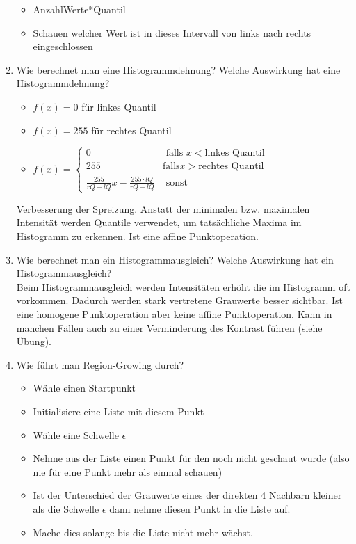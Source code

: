 \begin{enumerate}
	\begin{itemize}
		\item AnzahlWerte*Quantil
		\item Schauen welcher Wert ist in dieses Intervall von links nach rechts eingeschlossen
	\end{itemize}
	
	\item Wie berechnet man eine Histogrammdehnung? Welche Auswirkung hat eine Histogrammdehnung?
	
	\begin{itemize}
		\item $f(x)=0$ für linkes Quantil
		\item $f(x)=255$ für rechtes Quantil
		\item $f(x) = \left\{ \begin{array}{cl} 0 & \textrm{ falls } x < \textrm{linkes Quantil} \\ 255 & \textrm{falls} x>\textrm{rechtes Quantil} \\ \frac{255}{rQ-lQ}x-\frac{255 \cdot lQ}{rQ-lQ} & \textrm{ sonst }\end{array} \right.$
	\end{itemize}

  Verbesserung der Spreizung. Anstatt der minimalen bzw. maximalen Intensität werden Quantile verwendet, um tatsächliche Maxima im Histogramm zu erkennen. Ist eine affine Punktoperation.
  
  \item Wie berechnet man ein Histogrammausgleich? Welche Auswirkung hat ein Histogrammausgleich? \\
	Beim Histogrammausgleich werden Intensitäten erhöht die im Histogramm oft vorkommen. Dadurch werden stark vertretene Grauwerte besser sichtbar. Ist eine homogene Punktoperation aber keine affine Punktoperation. Kann in manchen Fällen auch zu einer Verminderung des Kontrast führen (siehe Übung).

	\item Wie führt man Region-Growing durch? \\
	
	\begin{itemize}
		\item Wähle einen Startpunkt
		\item Initialisiere eine Liste mit diesem Punkt
		\item Wähle eine Schwelle $\epsilon$
		\item Nehme aus der Liste einen Punkt für den noch nicht geschaut wurde (also nie für eine Punkt mehr als einmal schauen)
		\item Ist der Unterschied der Grauwerte eines der direkten 4 Nachbarn kleiner als die Schwelle $\epsilon$ dann nehme diesen Punkt in die Liste auf.
		\item Mache dies solange bis die Liste nicht mehr wächst.
	\end{itemize}
	

\end{enumerate}

